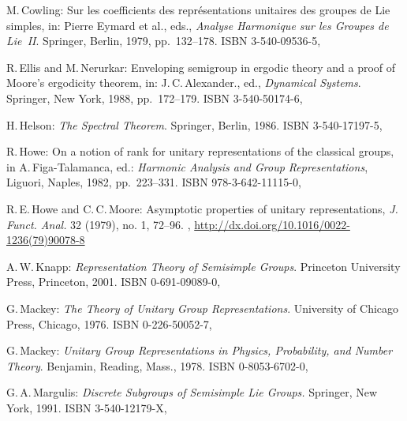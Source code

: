 \begin{references}{99}

M.\,Cowling:
Sur les coefficients des repr\'esentations unitaires des groupes de Lie simples,
in: Pierre Eymard et al., eds.,
\emph{Analyse Harmonique sur les Groupes de Lie~II}.
Springer, Berlin, 1979, pp.~132--178.
ISBN 3-540-09536-5,

 R.\,Ellis and M.\,Nerurkar:
 Enveloping semigroup in ergodic theory and a proof of
Moore's ergodicity theorem,
 in: J.\,C.\,Alexander., ed.,
 \emph{Dynamical Systems}.
Springer, New York, 1988, pp.~172--179.
ISBN 3-540-50174-6,

H.\,Helson:
\emph{The Spectral Theorem}.
Springer, Berlin, 1986.
ISBN 3-540-17197-5,

R.\,Howe:
On a notion of rank for unitary representations of the classical groups,
in A.\,Figa-Talamanca, ed.:
\emph{Harmonic Analysis and Group Representations}, 
Liguori, Naples, 1982, 
pp.~223--331.
ISBN 978-3-642-11115-0,

R.\,E.\,Howe and C.\,C.\,Moore:
Asymptotic properties of unitary representations,
\emph{J. Funct. Anal.} 32 (1979), no. 1, 72--96. 
 ,
 \maynewline
 \url{http://dx.doi.org/10.1016/0022-1236(79)90078-8}

A.\,W.\,Knapp:
\emph{Representation Theory of Semisimple Groups}. 
Princeton University Press, Princeton, 2001.
ISBN 0-691-09089-0,

G.\,Mackey:
\emph{The Theory of Unitary Group Representations}. 
University of Chicago Press, Chicago, 1976.
ISBN 0-226-50052-7,

G.\,Mackey:
\emph{Unitary Group Representations in Physics, Probability, and Number Theory}.
Benjamin, Reading, Mass., 1978. 
ISBN 0-8053-6702-0,

 G.\,A.\,Margulis:
 \emph{Discrete Subgroups of Semisimple Lie Groups.}
 Springer, New York, 1991.
ISBN 3-540-12179-X,


\end{references}
